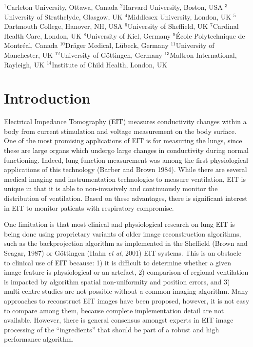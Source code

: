 \documentclass[letterpaper,twocolumn,10pt]{article}
\newcommand{\etal}{{\em et al}}
\begin{document}

{\small
\noindent 
 $^{1}$Carleton University, Ottawa, Canada
 $^{2}$Harvard University, Boston, USA
 $^{3}$University of Strathclyde, Glasgow, UK
 $^{4}$Middlesex University, London, UK
 $^{5}$Dartmouth College, Hanover, NH, USA
 $^{6}$University of Sheffield, UK
 $^{7}$Cardinal Health Care, London, UK
 $^{8}$University of Kiel, Germany
 $^{9}$\'Ecole Polytechnique de Montr\'eal, Canada
$^{10}$Dr\"ager Medical, L\"ubeck, Germany
$^{11}$University of Manchester, UK
$^{12}$University of G\"ottingen, Germany
$^{13}$Maltron International, Rayleigh, UK
$^{14}$Institute of Child Health, London, UK
}

\section{Introduction}
Electrical Impedance Tomography (EIT) measures conductivity
changes within a body from current stimulation and voltage
measurement on the body surface. One of the most promising
applications of EIT is for measuring the lungs, since these
are large organs which undergo large changes in conductivity
during normal functioning. Indeed, lung function measurement
was among the first physiological applications of this technology
(Barber and Brown 1984).
While there are several medical imaging and instrumentation
technologies to measure ventilation, EIT is unique in that it
is able to non-invasively and continuously monitor the distribution of 
ventilation. Based on these advantages, there is significant
interest in EIT to 
monitor patients with respiratory compromise.

One limitation is that most clinical and physiological research
on lung EIT is being done using proprietary variants of
older image reconstruction algorithms, such as the backprojection
algorithm as implemented
in the Sheffield (Brown and Seagar, 1987)
or G\"ottingen (Hahn \etal, 2001) EIT systems.
This is an obstacle to clinical use of EIT because:
1) it is difficult to determine whether a given image feature is 
physiological or an artefact,
2) comparison of regional ventilation is impacted by
algorithm spatial non-uniformity and position errors,
and 
3) multi-centre studies are not possible without a 
common imaging algorithm.
Many approaches to reconstruct EIT images have been proposed,
however, it is not easy to compare among them, because 
complete implementation detail are not available.
However, there is general consensus amongst experts
in EIT image processing of the ``ingredients'' that should
be part of a robust and high performance algorithm.
\end{document}
